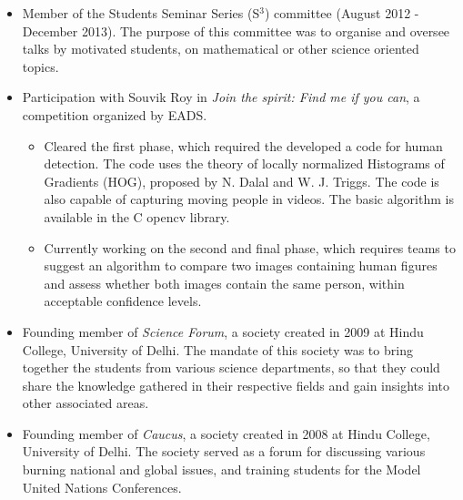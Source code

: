 \documentclass[margin]{res}
\begin{document}
\begin{resume}
               \begin{itemize} \itemsep -2pt
               \item Member of the Students Seminar Series (S$^3$) committee (August 2012 - December 2013). The purpose of this committee was to organise and oversee talks by motivated students, on mathematical or other science oriented topics.
               \item Participation with Souvik Roy in {\it Join the spirit: Find me if you can}, a competition organized by EADS.
	      \begin{itemize}
	          \item Cleared the first phase, which required the developed a code for human detection. The code uses the theory of locally normalized Histograms of Gradients (HOG), proposed by N. Dalal and W. J. Triggs. The code is also capable of capturing moving people in videos. The basic algorithm is available in the C opencv library.
	          \item Currently working on the second and final phase, which requires teams to suggest an algorithm to compare two images containing human figures and assess whether both images contain the same person, within acceptable confidence levels. 
	      \end{itemize}    
               \item Founding member of {\it Science Forum}, a society created in 2009 at Hindu College, University of Delhi. The mandate of this society was to bring together the students from various science departments, so that they could share the knowledge gathered in their respective fields and gain insights into other associated areas.
               \item Founding member of {\it Caucus}, a society created in 2008 at Hindu College, University of Delhi. The society served as a forum for discussing various burning national and global issues, and training students for the Model United Nations Conferences.
               \end{itemize}                    
               
               



\end{resume}
\end{document}
